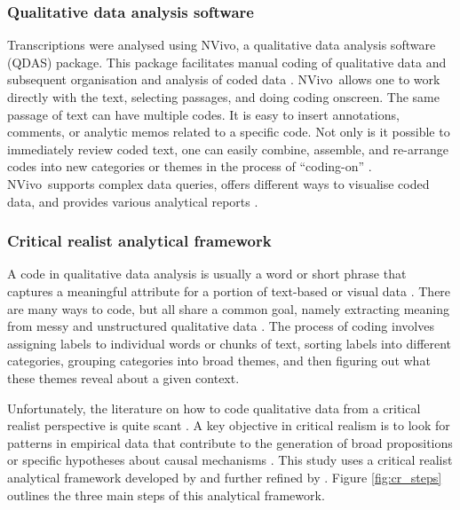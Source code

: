 \subsubsection{Qualitative data analysis software}

Transcriptions were analysed using NVivo\texttrademark, a qualitative data analysis software (QDAS) package. This package facilitates manual coding of qualitative data and subsequent organisation and analysis of coded data \citep{bazeley2013qualitative}. NVivo\texttrademark\ allows one to work directly with the text, selecting passages, and doing coding onscreen. The same passage of text can have multiple codes. It is easy to insert annotations, comments, or analytic memos related to a specific code. Not only is it possible to immediately review coded text, one can easily combine, assemble, and re-arrange codes into new categories or themes in the process of \enquote{coding\hyp{}on} \citep{richards2012readme}. NVivo\texttrademark\ supports complex data queries, offers different ways to visualise coded data, and provides various analytical reports \citep{bazeley2013qualitative}. 

\subsubsection{Critical realist analytical framework} \label{sss:cr_framewk}

A code in qualitative data analysis is usually a word or short phrase that captures a meaningful attribute for a portion of text-based or visual data \citep{saldana2015coding}. There are many ways to code, but all share a common goal, namely extracting meaning from messy and unstructured qualitative data \citep{richards2012readme}. The process of coding involves assigning labels to individual words or chunks of text, sorting labels into different categories, grouping categories into broad themes, and then figuring out what these themes reveal about a given context. \medskip

Unfortunately, the literature on how to code qualitative data from a critical realist perspective is quite scant \citep{fletcher2017applying}. A key objective in critical realism is to look for patterns in empirical data that contribute to the generation of broad propositions or specific hypotheses about causal mechanisms \citep{zachariadis2013methodological}. This study uses a critical realist analytical framework developed by \cite{bygstad2016identifying} and further refined by \citet{mcavoy2018critical}. Figure \ref{fig:cr_steps} outlines the three main steps of this analytical framework. \medskip
 

